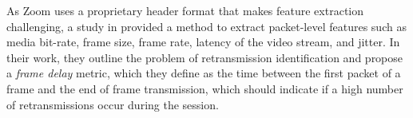 As Zoom uses a proprietary header format that makes feature extraction challenging, a study in \cite{michel2022enabling} provided a method to extract packet-level features such as media bit-rate, frame size, frame rate, latency of the video stream, and jitter. 
In their work, they outline the problem of retransmission identification and propose a \textit{frame delay} metric, which they define as the time between the first packet of a frame and the end of frame transmission, which should indicate if a high number of retransmissions occur during the session.


